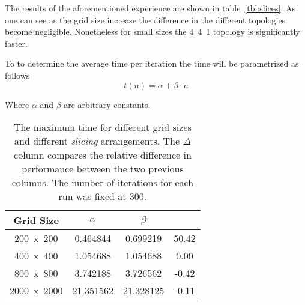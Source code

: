 The results of the aforementioned experience are shown in table~\ref{tbl:slices}. As one can see as the grid size increase the difference in the different topologies become negligible. Nonetheless for small sizes the 4~4~1 topology is significantly faster.

To to determine the average time per iteration the time will be parametrized as follows
\[
t(n) = \alpha + \beta \cdot n
\]

Where $\alpha$ and $\beta$ are arbitrary constants.

\begin{table}[H]
\centering
\begin{tabular}{cccc}
 \toprule
Grid Size & $\alpha$ & $\beta$ \\ \midrule
200~x~200   &     0.464844 &     0.699219 &    50.42 \\
400~x~400   &     1.054688 &     1.054688 &     0.00 \\
800~x~800   &     3.742188 &     3.726562 &    -0.42 \\
2000~x~2000 &    21.351562 &    21.328125 &    -0.11 \\
\bottomrule
\end{tabular}
\caption{The maximum time for different grid sizes and different \emph{slicing} arrangements. The $\Delta$ column compares the relative difference in performance between the two previous columns. The number of iterations for each run was fixed at 300.}
\label{tbl:alphabeta}
\end{table}